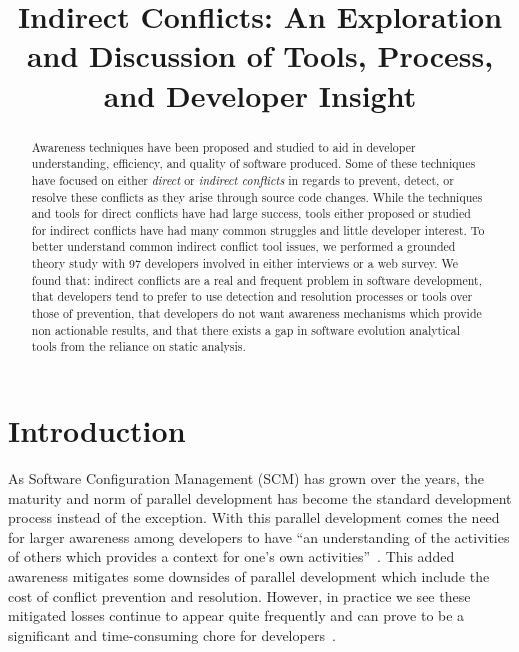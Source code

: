 \documentclass[conference]{IEEEtran}
\begin{document}
\title{Indirect Conflicts: An Exploration and Discussion of Tools, Process, and Developer Insight}

\author{
}

\maketitle

\begin{abstract}

Awareness techniques have been proposed and studied to aid in developer
understanding, efficiency, and quality of software produced. Some of these techniques have focused 
on either \textit{direct} or 
\textit{indirect conflicts} in regards to prevent, detect, or resolve these conflicts as they arise
through source code changes. While the techniques and tools for direct conflicts have had
large success, tools either proposed or studied for indirect conflicts have had many common
struggles and little developer interest. To better understand common indirect conflict tool issues, 
we performed a grounded theory study with 97 developers involved in either
interviews or a web survey. We found that: indirect conflicts are a real and frequent problem in
software development, that developers tend to prefer to use detection and resolution processes or tools
over those of prevention, that developers do not want awareness mechanisms which provide non actionable results,
and that there exists a gap in software evolution analytical tools from the reliance on static analysis.

\end{abstract}

\section{Introduction}
\label{sec:intro}

As Software Configuration Management (SCM) has grown over the years, the maturity and norm of parallel 
development has become the standard development process instead of the exception. With this parallel development
comes the need for larger awareness among developers to have ``an understanding of the activities of others
which provides a context for one's own activities''~\cite{Dourish:1992:ACS}. This added awareness
mitigates some downsides of parallel development which include the cost of conflict prevention and resolution. However,
in practice we see these mitigated losses continue to appear quite frequently and can prove to be a significant
and time-consuming chore for developers~\cite{Perry:2001:PCL}.
\end{document}
